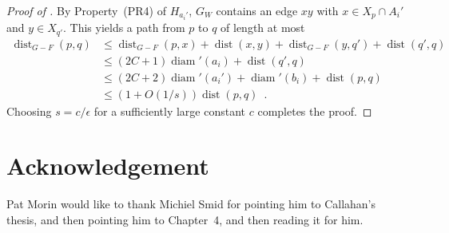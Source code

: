 \documentclass{patmorin}
\DeclareMathOperator{\diam}{diam}
\DeclareMathOperator{\dist}{dist}
\begin{document}
\begin{proof}[Proof of ]
  By Property~(PR4) of $H_{a_i'}$, $G_W$ contains an edge $xy$ with $x\in X_p\cap A_i'$ and $y\in X_{q'}$.  
   This yields a path from $p$ to $q$ of length at most
  \begin{align*}
    \dist_{G-F}(p,q) & \le \dist_{G-F}(p,x) + \dist(x,y) + \dist_{G-F}(y,q') + \dist(q',q) \\
      & \le (2C+1)\diam'(a_i) + \dist(q',q) \\
      & \le (2C+2)\diam'(a_i') + \diam'(b_i) + \dist(p,q) \\
      & \le (1+O(1/s))\dist(p,q) \enspace . 
  \end{align*}
  Choosing $s = c/\epsilon$ for a sufficiently large constant $c$
  completes the proof.
\end{proof}

\section*{Acknowledgement}

Pat Morin would like to thank Michiel Smid for pointing him to Callahan's thesis, and then pointing him to Chapter~4, and then reading it for him.




\end{document}
